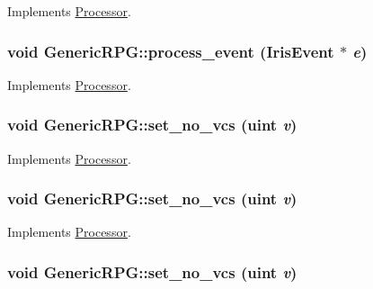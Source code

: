 Implements \hyperlink{classProcessor_18cdeefafbd8225cb3ad18dd098c0e08}{Processor}.\hypertarget{classGenericRPG_72d08c87beeb16514c6c81af3296f6af}{
\subsubsection[{process\_\-event}]{\setlength{\rightskip}{0pt plus 5cm}void GenericRPG::process\_\-event ({\bf IrisEvent} $\ast$ {\em e})}}
\label{classGenericRPG_72d08c87beeb16514c6c81af3296f6af}




Implements \hyperlink{classProcessor_18cdeefafbd8225cb3ad18dd098c0e08}{Processor}.\hypertarget{classGenericRPG_0f15df71a8cb244d55a2dce961b7a972}{
\subsubsection[{set\_\-no\_\-vcs}]{\setlength{\rightskip}{0pt plus 5cm}void GenericRPG::set\_\-no\_\-vcs ({\bf uint} {\em v})}}
\label{classGenericRPG_0f15df71a8cb244d55a2dce961b7a972}




Implements \hyperlink{classProcessor_3280abfe3637712e09cc651b2d09732e}{Processor}.\hypertarget{classGenericRPG_0f15df71a8cb244d55a2dce961b7a972}{
\subsubsection[{set\_\-no\_\-vcs}]{\setlength{\rightskip}{0pt plus 5cm}void GenericRPG::set\_\-no\_\-vcs ({\bf uint} {\em v})}}
\label{classGenericRPG_0f15df71a8cb244d55a2dce961b7a972}




Implements \hyperlink{classProcessor_3280abfe3637712e09cc651b2d09732e}{Processor}.\hypertarget{classGenericRPG_0f15df71a8cb244d55a2dce961b7a972}{
\subsubsection[{set\_\-no\_\-vcs}]{\setlength{\rightskip}{0pt plus 5cm}void GenericRPG::set\_\-no\_\-vcs ({\bf uint} {\em v})}}
\label{classGenericRPG_0f15df71a8cb244d55a2dce961b7a972}




